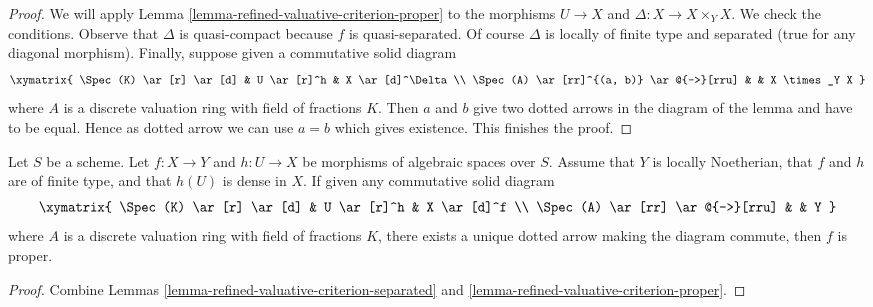 \begin{proof}
We will apply Lemma \ref{lemma-refined-valuative-criterion-proper}
to the morphisms $U \to X$ and $\Delta : X \to X \times_Y X$.
We check the conditions. Observe that $\Delta$ is quasi-compact because
$f$ is quasi-separated. Of course $\Delta$ is locally of finite type and
separated (true for any diagonal morphism).
Finally, suppose given a commutative solid diagram
$$
\xymatrix{
\Spec(K) \ar[r] \ar[d] & U \ar[r]^h & X \ar[d]^\Delta \\
\Spec(A) \ar[rr]^{(a, b)} \ar@{-->}[rru] & & X \times_Y X
}
$$
where $A$ is a discrete valuation ring with field of fractions $K$.
Then $a$ and $b$ give two dotted arrows in the diagram of the lemma
and have to be equal. Hence as dotted arrow we can use $a = b$
which gives existence. This finishes the proof.
\end{proof}

\begin{lemma}
\label{lemma-refined-valuative-criterion-universally-closed}
Let $S$ be a scheme.
Let $f : X \to Y$ and $h : U \to X$ be morphisms of algebraic spaces over $S$.
Assume that $Y$ is locally Noetherian, that $f$ and $h$ are of finite type, and
that $h(U)$ is dense in $X$. If given any commutative solid diagram
$$
\xymatrix{
\Spec(K) \ar[r] \ar[d] & U \ar[r]^h & X \ar[d]^f \\
\Spec(A) \ar[rr] \ar@{-->}[rru] & & Y
}
$$
where $A$ is a discrete valuation ring with field of fractions $K$, there
exists a unique dotted arrow making the diagram commute, then $f$ is proper.
\end{lemma}

\begin{proof}
Combine Lemmas \ref{lemma-refined-valuative-criterion-separated} and
\ref{lemma-refined-valuative-criterion-proper}.
\end{proof}











